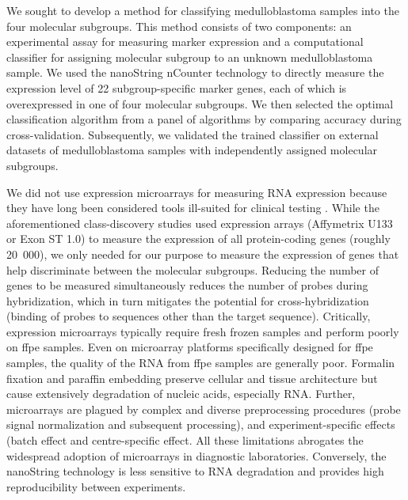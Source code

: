We sought to develop a method for classifying medulloblastoma samples into the four molecular subgroups. This method consists of two components: an experimental assay for measuring marker expression and a computational classifier for assigning molecular subgroup to an unknown medulloblastoma sample. We used the nanoString nCounter technology  to directly measure the expression level of 22 subgroup-specific marker genes, each of which is overexpressed in one of four molecular subgroups. We then selected the optimal classification algorithm from a panel of algorithms by comparing accuracy during cross-validation. Subsequently, we validated the trained classifier on external datasets of medulloblastoma samples with independently assigned molecular subgroups.

We did not use expression microarrays for measuring RNA expression because they have long been considered tools ill-suited for clinical testing . While the aforementioned class-discovery studies used expression arrays (Affymetrix U133 or Exon ST 1.0) to measure the expression of all protein-coding genes (roughly 20~000), we only needed for our purpose to measure the expression of genes that help discriminate between the molecular subgroups.  Reducing the number of genes to be measured simultaneously reduces the number of probes during hybridization, which in turn mitigates the potential for cross-hybridization (binding of probes to sequences other than the target sequence). Critically, expression microarrays typically require fresh frozen samples and perform poorly on \gls{ffpe} samples. Even on microarray platforms specifically designed for \gls{ffpe} samples, the quality of the RNA from \gls{ffpe} samples are generally poor. Formalin fixation and paraffin embedding preserve cellular and tissue architecture but cause extensively degradation of nucleic acids, especially RNA. Further, microarrays are plagued by complex and diverse preprocessing procedures (probe signal normalization and subsequent processing), and experiment-specific effects (batch effect and centre-specific effect. All these limitations abrogates the widespread adoption of microarrays in diagnostic laboratories. Conversely, the nanoString technology is less sensitive to RNA degradation and provides high reproducibility between experiments.

